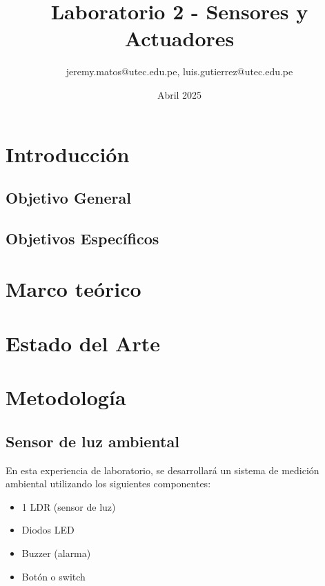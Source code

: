 \documentclass{article}
\title{Laboratorio 2 - Sensores y Actuadores}
\author{jeremy.matos@utec.edu.pe, luis.gutierrez@utec.edu.pe}
\date{Abril 2025}
\begin{document}
\maketitle

\newpage
\tableofcontents
\newpage

\section{Introducción}

\subsection{Objetivo General}

\subsection{Objetivos Específicos}

\newpage

\section{Marco teórico}

\section{Estado del Arte}





\section{Metodología}

\subsection{Sensor de luz ambiental}

En esta experiencia de laboratorio, se desarrollará un sistema de medición ambiental utilizando los siguientes componentes: 
\begin{itemize}
    \item 1 LDR (sensor de luz)
    \item Diodos LED
    \item Buzzer (alarma)
    \item Botón o switch
\end{itemize}
\end{document}
